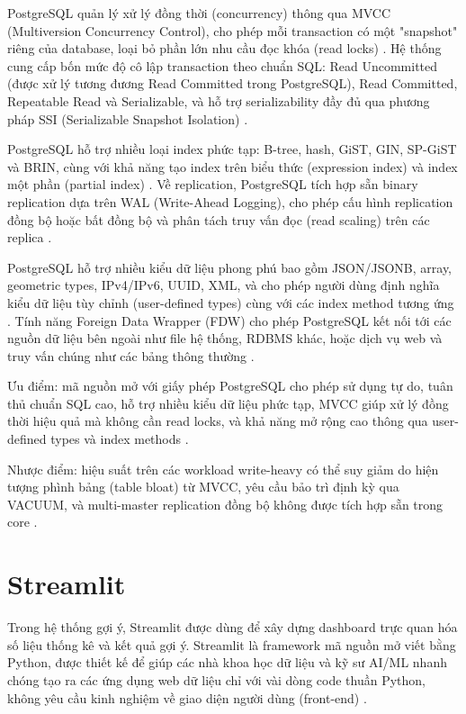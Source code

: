 \documentclass[../BTL.tex]{subfiles}
\begin{document}
PostgreSQL quản lý xử lý đồng thời (concurrency) thông qua MVCC (Multiversion Concurrency Control), cho phép mỗi transaction có một "snapshot" riêng của database, loại bỏ phần lớn nhu cầu đọc khóa (read locks) \cite{postgresql_wikipedia}. Hệ thống cung cấp bốn mức độ cô lập transaction theo chuẩn SQL: Read Uncommitted (được xử lý tương đương Read Committed trong PostgreSQL), Read Committed, Repeatable Read và Serializable, và hỗ trợ serializability đầy đủ qua phương pháp SSI (Serializable Snapshot Isolation) \cite{postgresql_wikipedia}.

PostgreSQL hỗ trợ nhiều loại index phức tạp: B-tree, hash, GiST, GIN, SP-GiST và BRIN, cùng với khả năng tạo index trên biểu thức (expression index) và index một phần (partial index) \cite{postgresql_wikipedia,postgresql_official}. Về replication, PostgreSQL tích hợp sẵn binary replication dựa trên WAL (Write-Ahead Logging), cho phép cấu hình replication đồng bộ hoặc bất đồng bộ và phân tách truy vấn đọc (read scaling) trên các replica \cite{postgresql_wikipedia}.

PostgreSQL hỗ trợ nhiều kiểu dữ liệu phong phú bao gồm JSON/JSONB, array, geometric types, IPv4/IPv6, UUID, XML, và cho phép người dùng định nghĩa kiểu dữ liệu tùy chỉnh (user-defined types) cùng với các index method tương ứng \cite{postgresql_wikipedia,postgresql_official}. Tính năng Foreign Data Wrapper (FDW) cho phép PostgreSQL kết nối tới các nguồn dữ liệu bên ngoài như file hệ thống, RDBMS khác, hoặc dịch vụ web và truy vấn chúng như các bảng thông thường \cite{postgresql_wikipedia}.

Ưu điểm: mã nguồn mở với giấy phép PostgreSQL cho phép sử dụng tự do, tuân thủ chuẩn SQL cao, hỗ trợ nhiều kiểu dữ liệu phức tạp, MVCC giúp xử lý đồng thời hiệu quả mà không cần read locks, và khả năng mở rộng cao thông qua user-defined types và index methods \cite{postgresql_wikipedia,postgresql_official}.

Nhược điểm: hiệu suất trên các workload write-heavy có thể suy giảm do hiện tượng phình bảng (table bloat) từ MVCC, yêu cầu bảo trì định kỳ qua VACUUM, và multi-master replication đồng bộ không được tích hợp sẵn trong core \cite{postgresql_wikipedia}.


\section{Streamlit}
Trong hệ thống gợi ý, Streamlit được dùng để xây dựng dashboard trực quan hóa số liệu thống kê và kết quả gợi ý. Streamlit là framework mã nguồn mở viết bằng Python, được thiết kế để giúp các nhà khoa học dữ liệu và kỹ sư AI/ML nhanh chóng tạo ra các ứng dụng web dữ liệu chỉ với vài dòng code thuần Python, không yêu cầu kinh nghiệm về giao diện người dùng (front-end) \cite{streamlit_official}.
\end{document}
